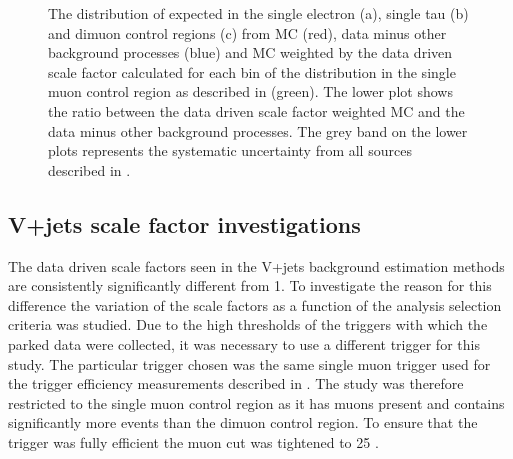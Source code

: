 \begin{figure}
  \caption{The distribution of \METnoMU expected in the single electron (a), single tau (b) and dimuon control regions (c) from MC (red), data minus other background processes (blue) and MC weighted by the data driven scale factor calculated for each bin of the \METnoMU distribution in the single muon control region as described in  (green). The lower plot shows the ratio between the data driven scale factor weighted MC and the data minus other background processes. The grey band on the lower plots represents the systematic uncertainty from all sources described in .}
  \label{fig:parkedclosure}
\end{figure}

\subsection{V+jets scale factor investigations}
\label{sec:parkedscalefactors}
The data driven scale factors seen in the V+jets background estimation methods are consistently significantly different from 1. To investigate the reason for this difference the variation of the scale factors as a function of the analysis selection criteria was studied. Due to the high thresholds of the triggers with which the parked data were collected, it was necessary to use a different trigger for this study. The particular trigger chosen was the same single muon trigger used for the trigger efficiency measurements described in . The study was therefore restricted to the single muon control region as it has muons present and contains significantly more events than the dimuon control region. To ensure that the trigger was fully efficient the muon \pt cut was tightened to 25 \GeV.

